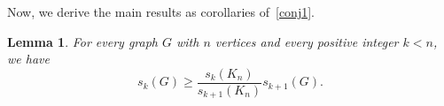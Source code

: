 \documentclass[11pt]{article}
\newtheorem{thr}{Theorem}[section]
\newtheorem{lem}[thr]{Lemma}
\theoremstyle{definition}
\newcommand{\cA}{\mathcal A}
\begin{document}




























Now, we derive the main results as corollaries of~\cref{conj1}.

\begin{lem}\label{lem:generalratio}
For every graph $G$ with $n$ vertices and every positive integer $k < n$, we have
$$s_k(G) \ge \frac{s_k(K_n)}{s_{k+1}(K_n)} s_{k+1}(G).$$
\end{lem}
\end{document}
